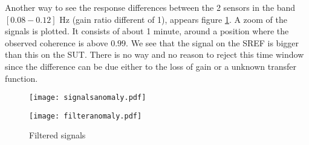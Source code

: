 Another way to see the response differences between the 2 sensors in the band  $[0.08-0.12]$ Hz (gain ratio different of 1), appears figure \ref{fig:filteredsignals}. A zoom of the signals is plotted. It consists of about 1 minute, around a position where the observed coherence is above $0.99$. We see that the signal on the SREF  is bigger than this on the SUT. There is no way and no reason to reject this time window since the difference can be due either to the loss of gain or a unknown transfer function. 
\begin{figure}%
\begin{minipage}{10cm}
              \texttt{[image: signalsanomaly.pdf]}
\end{minipage}
\begin{minipage}[c]{8cm}
              \texttt{[image: filteranomaly.pdf]}    

\end{minipage}
\centering
\caption{Filtered signals}
\label{fig:filteredsignals}
\end{figure}

